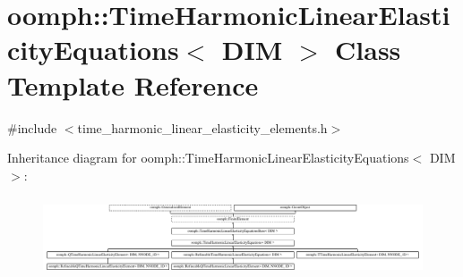 \hypertarget{classoomph_1_1TimeHarmonicLinearElasticityEquations}{}\section{oomph\+:\+:Time\+Harmonic\+Linear\+Elasticity\+Equations$<$ D\+IM $>$ Class Template Reference}
\label{classoomph_1_1TimeHarmonicLinearElasticityEquations}


{\ttfamily \#include $<$time\+\_\+harmonic\+\_\+linear\+\_\+elasticity\+\_\+elements.\+h$>$}

Inheritance diagram for oomph\+:\+:Time\+Harmonic\+Linear\+Elasticity\+Equations$<$ D\+IM $>$\+:\begin{figure}[H]
\begin{center}
\leavevmode
\includegraphics[height=2.398287cm]{classoomph_1_1TimeHarmonicLinearElasticityEquations}
\end{center}
\end{figure}
